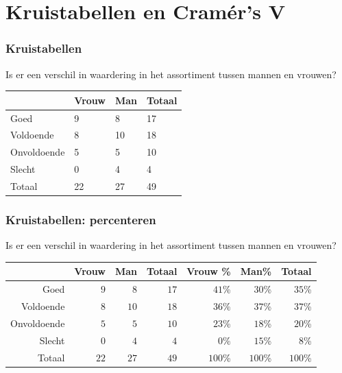 \documentclass[aspectratio=169]{beamer}
\begin{document}
\begin{frame}
\begin{columns}
\begin{column}{0.3\textwidth}
    \end{column}
  \end{columns}
\end{frame}

\section{Kruistabellen en Cramér's V}

\begin{frame}
  \frametitle{Kruistabellen}
  Is er een verschil in waardering in het assortiment tussen mannen en vrouwen?

  \begin{table}[h]
    \begin{tabular}{l||l|l||l}
      & Vrouw & Man & Totaal \\ \hline \hline
      Goed        & 9     & 8   & 17     \\
      Voldoende   & 8     & 10  & 18     \\
      Onvoldoende & 5     & 5   & 10     \\
      Slecht      & 0     & 4   & 4      \\ \hline \hline
      Totaal      & 22    & 27  & 49     \\
    \end{tabular}
  \end{table}
\end{frame}

\begin{frame}
  \frametitle{Kruistabellen: percenteren}
  Is er een verschil in waardering in het assortiment tussen mannen en vrouwen?
  \begin{adjustwidth}{-1.5em}{-1.5em}
    \begin{table}[h] \centering
      \begin{tabular}{@{}rrrrrrr@{}} \toprule
        & Vrouw & Man & Totaal & Vrouw \% & Man\%   & Totaal  \\ \midrule
        Goed        & $9$     & $8$  & $17$     & $41$\%  & $30$\%  & $35$\% \\
        Voldoende   & $8$     & $10$ & $18$     & $36$\%  & $37$\%  & $37$\% \\
        Onvoldoende & $5$     & $5$  & $10$     & $23$\%  & $18$\%  & $20$\% \\
        Slecht      & $0$     & $4$  & $4$      & $0$\%   & $15$\%  & $8$\%  \\
        Totaal      & $22$    & $27$ & $49$     & $100$\% & $100$\% & $100$\%\\
        \bottomrule
      \end{tabular}
    \end{table}
  \end{adjustwidth}
\end{frame}
\end{document}
